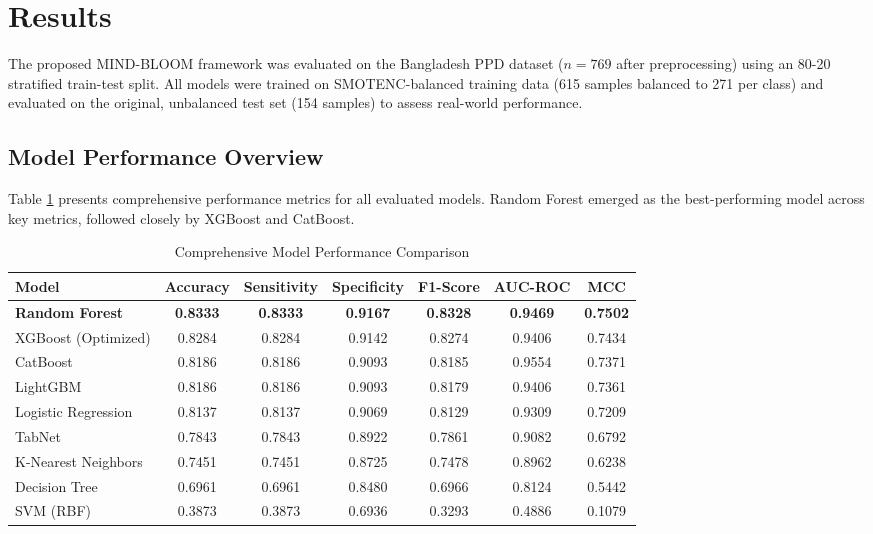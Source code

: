 \section{Results}

The proposed MIND-BLOOM framework was evaluated on the Bangladesh PPD dataset ($n=769$ after preprocessing) using an 80-20 stratified train-test split. All models were trained on SMOTENC-balanced training data (615 samples balanced to 271 per class) and evaluated on the original, unbalanced test set (154 samples) to assess real-world performance.

\subsection{Model Performance Overview}

Table \ref{tab:model_performance} presents comprehensive performance metrics for all evaluated models. Random Forest emerged as the best-performing model across key metrics, followed closely by XGBoost and CatBoost.

\begin{table}[htbp]
\centering
\caption{Comprehensive Model Performance Comparison}
\label{tab:model_performance}
\begin{tabular}{lcccccc}
\toprule
\textbf{Model} & \textbf{Accuracy} & \textbf{Sensitivity} & \textbf{Specificity} & \textbf{F1-Score} & \textbf{AUC-ROC} & \textbf{MCC} \\
\midrule
\textbf{Random Forest} & \textbf{0.8333} & \textbf{0.8333} & \textbf{0.9167} & \textbf{0.8328} & \textbf{0.9469} & \textbf{0.7502} \\
XGBoost (Optimized) & 0.8284 & 0.8284 & 0.9142 & 0.8274 & 0.9406 & 0.7434 \\
CatBoost & 0.8186 & 0.8186 & 0.9093 & 0.8185 & 0.9554 & 0.7371 \\
LightGBM & 0.8186 & 0.8186 & 0.9093 & 0.8179 & 0.9406 & 0.7361 \\
Logistic Regression & 0.8137 & 0.8137 & 0.9069 & 0.8129 & 0.9309 & 0.7209 \\
TabNet & 0.7843 & 0.7843 & 0.8922 & 0.7861 & 0.9082 & 0.6792 \\
K-Nearest Neighbors & 0.7451 & 0.7451 & 0.8725 & 0.7478 & 0.8962 & 0.6238 \\
Decision Tree & 0.6961 & 0.6961 & 0.8480 & 0.6966 & 0.8124 & 0.5442 \\
SVM (RBF) & 0.3873 & 0.3873 & 0.6936 & 0.3293 & 0.4886 & 0.1079 \\
\bottomrule
\end{tabular}
\end{table}

